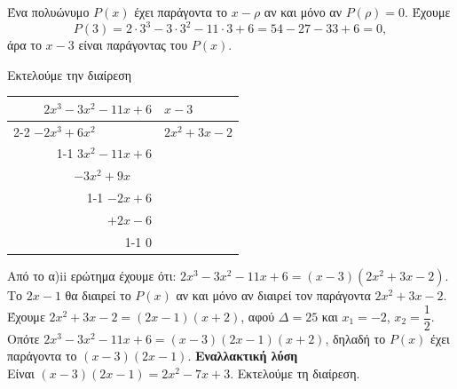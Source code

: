 \begin{alist}
\item
\begin{rlist}
\item Ένα πολυώνυμο $P(x)$ έχει παράγοντα το $x - \rho$ αν και μόνο αν $P(\rho) = 0$. Έχουμε
\[P(3) = 2 \cdot 3^3 - 3 \cdot 3^2 - 11 \cdot 3 + 6 = 54 - 27 - 33 + 6 = 0,\]
άρα το $x - 3$ είναι παράγοντας του $P(x)$.
\item Εκτελούμε την διαίρεση
\begin{center}
\begin{tabular}{r|l}
$2x^3 - 3x^2 - 11x + 6$ & $x - 3$ \\ \cline{2-2}
$-2x^3 + 6x^2 \phantom{{} - 11x + 6}$ & $2x^2 + 3x - 2$ \\ \cline{1-1}
$3x^2 - 11x + 6$ & \\
$-3x^2 + 9x \phantom{{} + 6}$ & \\ \cline{1-1}
$-2x + 6$ & \\
$+2x - 6$ & \\ \cline{1-1}
$0$ &
\end{tabular}
\end{center}
\end{rlist}
\item Από το α)ii ερώτημα έχουμε ότι: $2x^3 - 3x^2 - 11x + 6 = (x-3)(2x^2 + 3x - 2)$. \\
Το $2x - 1$ θα διαιρεί το $P(x)$ αν και μόνο αν διαιρεί τον παράγοντα $2x^2 + 3x - 2$. \\
Έχουμε $2x^2 + 3x - 2 = (2x - 1)(x + 2)$, αφού $\Delta = 25$ και $x_1 = -2$, $x_2 = \dfrac{1}{2}$. \\
Οπότε $2x^3 - 3x^2 - 11x + 6 = (x - 3)(2x - 1)(x + 2)$, δηλαδή το $P(x)$ έχει παράγοντα το $(x - 3)(2x - 1)$.
\textbf{Εναλλακτική λύση} \\
Είναι $(x - 3)(2x - 1) = 2x^2 - 7x + 3$. Εκτελούμε τη διαίρεση.
\end{alist}

